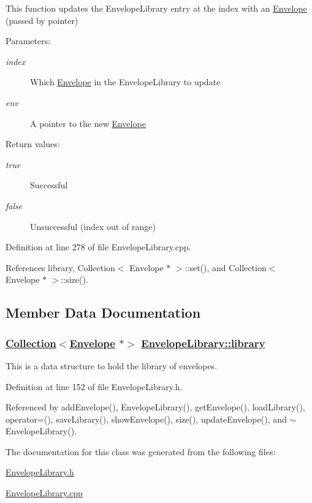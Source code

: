 This function updates the Envelope\-Library entry at the index with an \hyperlink{classEnvelope}{Envelope} (passed by pointer) \begin{Desc}
\item[Parameters:]
\begin{description}
\item[{\em index}]Which \hyperlink{classEnvelope}{Envelope} in the Envelope\-Library to update \item[{\em env}]A pointer to the new \hyperlink{classEnvelope}{Envelope} \end{description}
\end{Desc}
\begin{Desc}
\item[Return values:]
\begin{description}
\item[{\em true}]Successful \item[{\em false}]Unsuccessful (index out of range) \end{description}
\end{Desc}


Definition at line 278 of file Envelope\-Library.cpp.

References library, Collection$<$ Envelope $\ast$ $>$::set(), and Collection$<$ Envelope $\ast$ $>$::size().

\subsection{Member Data Documentation}
\hypertarget{classEnvelopeLibrary_r0}{
\subsubsection[library]{\setlength{\rightskip}{0pt plus 5cm}\hyperlink{classCollection}{Collection}$<$\hyperlink{classEnvelope}{Envelope} $\ast$$>$ \hyperlink{classEnvelopeLibrary_r0}{Envelope\-Library::library}}}
\label{classEnvelopeLibrary_r0}


This is a data structure to hold the library of envelopes. 

Definition at line 152 of file Envelope\-Library.h.

Referenced by add\-Envelope(), Envelope\-Library(), get\-Envelope(), load\-Library(), operator=(), save\-Library(), show\-Envelope(), size(), update\-Envelope(), and $\sim$Envelope\-Library().

The documentation for this class was generated from the following files:\begin{CompactItemize}
\item 
\hyperlink{EnvelopeLibrary_8h}{Envelope\-Library.h}\item 
\hyperlink{EnvelopeLibrary_8cpp}{Envelope\-Library.cpp}\end{CompactItemize}
